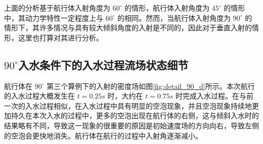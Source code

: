 上面的分析基于航行体入射角度为 $60 ^\circ$ 的情形，航行体入射角度为 $45 ^\circ$ 的情形中，其动力学特性一定程度上与 $60 ^\circ$ 的相同。然而，当航行体入射角度为 $90 ^\circ$ 的情形下，其许多情况与具有较大倾斜角度的入射是不同的，因此对于垂直入射的情形，这里也打算对其进行分析。

\subsection{$90 ^\circ$入水条件下的入水过程流场状态细节}

航行体在 $90 ^\circ$ 第三个算例下的入射的密度场如图\ref{fig:detail_90_d}所示。本次航行的入水过程大概发生在 $t = 0.25s$ 时，大约在 $t = 0.75s$ 时完成入水过程。在与前一次的入水过程相似，在入水过程中具有明显的空泡现象，并且空泡现象持续地更加持久在本次入水的过程中，更多的空泡出现在航行体的右侧，这与倾斜入水时的结果略有不同，导致这一现象的很重要的原因是初始速度场的方向向右，导致左侧的空泡会更快地消失。航行体在航行的过程中入射角逐渐减小。

